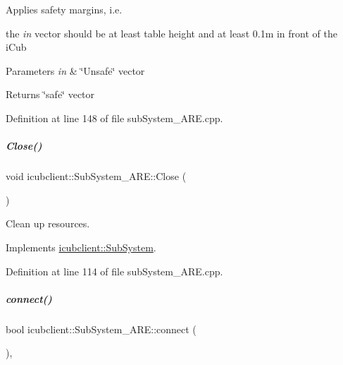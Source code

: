 Applies safety margins, i.\+e. 

the {\itshape in} vector should be at least table height and at least 0.\+1m in front of the i\+Cub 
\begin{DoxyParams}{Parameters}
{\em in} & \char`\"{}\+Unsafe\char`\"{} vector \\
\hline
\end{DoxyParams}
\begin{DoxyReturn}{Returns}
\char`\"{}safe\char`\"{} vector 
\end{DoxyReturn}


Definition at line 148 of file sub\+System\+\_\+\+A\+R\+E.\+cpp.

\mbox{\label{group__icubclient__subsystems_a570bb3cc879e0547a04e82b231a9f57f}} 
\subparagraph{\texorpdfstring{Close()}{Close()}}
{\footnotesize\ttfamily void icubclient\+::\+Sub\+System\+\_\+\+A\+R\+E\+::\+Close (\begin{DoxyParamCaption}{ }\end{DoxyParamCaption})\hspace{0.3cm}{\ttfamily [virtual]}}



Clean up resources. 



Implements \hyperlink{group__icubclient__subsystems_af327c56ad0d33aada77f825d96fb47f2}{icubclient\+::\+Sub\+System}.



Definition at line 114 of file sub\+System\+\_\+\+A\+R\+E.\+cpp.

\mbox{\label{group__icubclient__subsystems_ab11c67c801f58eca84e8ef2941d4f2a8}} 
\subparagraph{\texorpdfstring{connect()}{connect()}}
{\footnotesize\ttfamily bool icubclient\+::\+Sub\+System\+\_\+\+A\+R\+E\+::connect (\begin{DoxyParamCaption}{ }\end{DoxyParamCaption})\hspace{0.3cm}{\ttfamily [protected]}, {\ttfamily [virtual]}}



